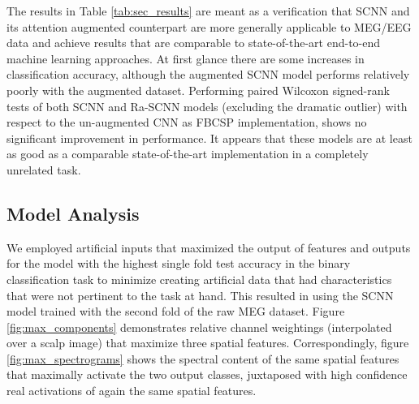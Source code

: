 \documentclass[fleqn,10pt]{wlscirep}
\begin{document}
The results in Table \ref{tab:sec_results} are meant as a verification that SCNN and its attention augmented counterpart are more generally applicable to MEG/EEG data and achieve results that are comparable to state-of-the-art end-to-end machine learning approaches. At first glance there are some increases in classification accuracy, although the augmented SCNN model performs relatively poorly with the augmented dataset. Performing paired Wilcoxon signed-rank tests of both SCNN and Ra-SCNN models (excluding the dramatic outlier) with respect to the un-augmented CNN as FBCSP implementation, shows no significant improvement in performance. It appears that these models are at least as good as a comparable state-of-the-art implementation in a completely unrelated task.

\subsection*{Model Analysis}

We employed artificial inputs that maximized the output of features and outputs for the model with the highest single fold test accuracy in the binary classification task to minimize creating artificial data that had characteristics that were not pertinent to the task at hand. This resulted in using the SCNN model trained with the second fold of the raw MEG dataset. Figure \ref{fig:max_components} demonstrates relative channel weightings (interpolated over a scalp image) that maximize three spatial features. Correspondingly, figure \ref{fig:max_spectrograms} shows the spectral content of the same spatial features that maximally activate the two output classes, juxtaposed with high confidence real activations of again the same spatial features.
\end{document}
